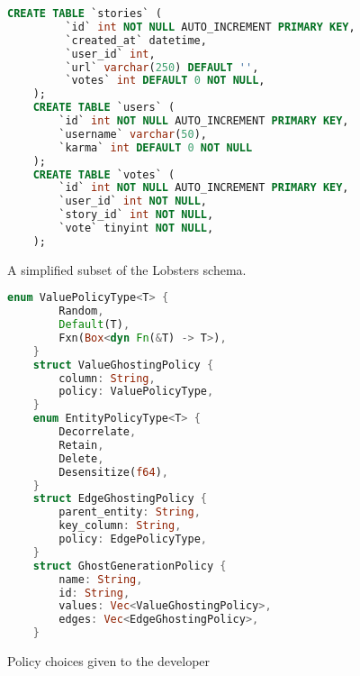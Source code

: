 \begin{figure}
\begin{lstlisting}[language=SQL, numbers=none]
    CREATE TABLE `stories` (
         `id` int NOT NULL AUTO_INCREMENT PRIMARY KEY, 
         `created_at` datetime, 
         `user_id` int, 
         `url` varchar(250) DEFAULT '', 
         `votes` int DEFAULT 0 NOT NULL, 
    );
    CREATE TABLE `users` (
        `id` int NOT NULL AUTO_INCREMENT PRIMARY KEY, 
        `username` varchar(50), 
        `karma` int DEFAULT 0 NOT NULL
    );
    CREATE TABLE `votes` (
        `id` int NOT NULL AUTO_INCREMENT PRIMARY KEY,
        `user_id` int NOT NULL, 
        `story_id` int NOT NULL,
        `vote` tinyint NOT NULL,
    );
\end{lstlisting}
\caption{A simplified subset of the Lobsters schema.}
\label{fig:schema}
\end{figure}

\begin{figure}
\begin{lstlisting}[language=rust, numbers=none]
    enum ValuePolicyType<T> {
        Random,
        Default(T),
        Fxn(Box<dyn Fn(&T) -> T>),
    }
    struct ValueGhostingPolicy {
        column: String,
        policy: ValuePolicyType,
    }
    enum EntityPolicyType<T> {
        Decorrelate,
        Retain,
        Delete,
        Desensitize(f64),
    }
    struct EdgeGhostingPolicy {
        parent_entity: String,
        key_column: String,
        policy: EdgePolicyType,
    }
    struct GhostGenerationPolicy {
        name: String,
        id: String,
        values: Vec<ValueGhostingPolicy>,
        edges: Vec<EdgeGhostingPolicy>,
    }
\end{lstlisting}
    \caption{Policy choices given to the developer}
\label{fig:policy}
\end{figure}

